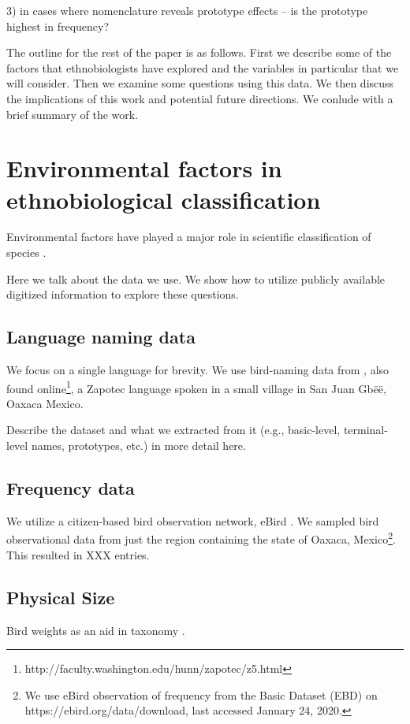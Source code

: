 \documentclass[10pt,letterpaper]{article}
\begin{document}
3) in cases where nomenclature reveals prototype effects -- is the prototype highest in frequency?

The outline for the rest of the paper is as follows. First we describe some of the factors that ethnobiologists have explored and the variables in particular that we will consider. Then we examine some questions using this data. We then discuss the implications of this work and potential future directions. We conlude with a brief summary of the work.


\section{Environmental factors in ethnobiological classification}
Environmental factors have played a major role in scientific classification of species \cite{amadon1943bird}.

Here we talk about the data we use. We show how to utilize publicly available digitized information to explore these questions.



\subsection{Language naming data}
We focus on a single language for brevity. We use bird-naming data from \cite{hunn2008zapotec}, also found online\footnote{http://faculty.washington.edu/hunn/zapotec/z5.html}, a Zapotec language spoken in a small village in San Juan Gb\"{e}\"{e}, Oaxaca Mexico.

Describe the dataset and what we extracted from it (e.g., basic-level, terminal-level names, prototypes, etc.) in more detail here.

\subsection{Frequency data}
We utilize a citizen-based bird observation network, eBird \cite{sullivan2009ebird}. We sampled bird observational data from just the region containing the state of Oaxaca, Mexico\footnote{We use eBird observation of frequency from the Basic Dataset (EBD) on https://ebird.org/data/download, last accessed January 24, 2020.}. This resulted in XXX entries. 



\subsection{Physical Size}
Bird weights as an aid in taxonomy \cite{amadon1943bird}.
\end{document}
